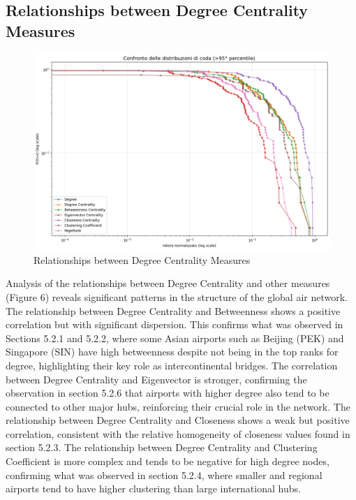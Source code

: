 \documentclass[12pt]{article}
\begin{document}
    \subsection{Relationships between Degree Centrality Measures}
    \begin{figure}[H]
        \centering
        \includegraphics[width=0.8\linewidth]{img/relationships_between_degree_centrality_measures.png}
        \caption{Relationships between Degree Centrality Measures}
    \end{figure}
    Analysis of the relationships between Degree Centrality and other measures (Figure 6) reveals significant patterns in the structure of the global air network.
    The relationship between Degree Centrality and Betweenness shows a positive correlation but with significant dispersion. This confirms what was observed in Sections 5.2.1 and 5.2.2, where some Asian airports such as Beijing (PEK) and Singapore (SIN) have high betweenness despite not being in the top ranks for degree, highlighting their key role as intercontinental bridges.
    The correlation between Degree Centrality and Eigenvector is stronger, confirming the observation in section 5.2.6 that airports with higher degree also tend to be connected to other major hubs, reinforcing their crucial role in the network.
    The relationship between Degree Centrality and Closeness shows a weak but positive correlation, consistent with the relative homogeneity of closeness values found in section 5.2.3.
    The relationship between Degree Centrality and Clustering Coefficient is more complex and tends to be negative for high degree nodes, confirming what was observed in section 5.2.4, where smaller and regional airports tend to have higher clustering than large international hubs.
    
\end{document}
